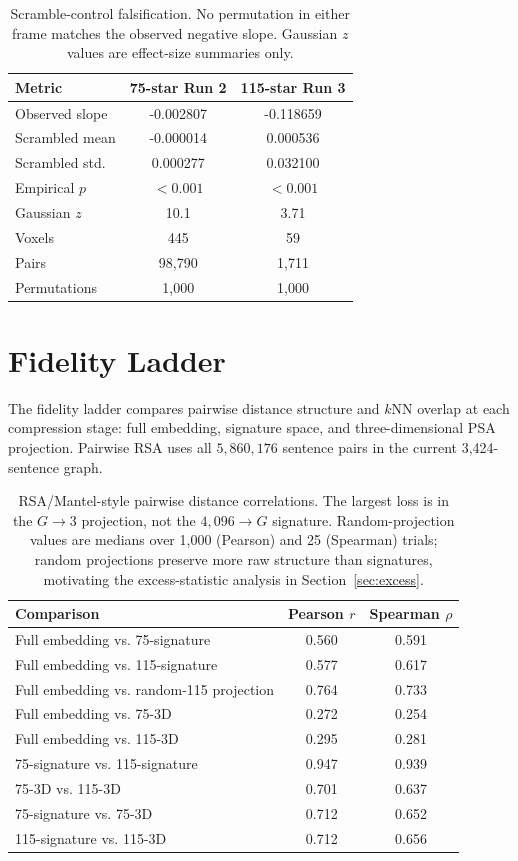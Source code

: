 \documentclass[11pt]{article}
\begin{document}
\begin{table}[t]
\centering
\small
\begin{tabular}{@{}lcc@{}}
\toprule
Metric & 75-star Run 2 & 115-star Run 3 \\
\midrule
Observed slope & -0.002807 & -0.118659 \\
Scrambled mean & -0.000014 & 0.000536 \\
Scrambled std. & 0.000277 & 0.032100 \\
Empirical $p$ & $<0.001$ & $<0.001$ \\
Gaussian $z$ & 10.1 & 3.71 \\
Voxels & 445 & 59 \\
Pairs & 98,790 & 1,711 \\
Permutations & 1,000 & 1,000 \\
\bottomrule
\end{tabular}
\caption{Scramble-control falsification. No permutation in either frame matches the observed negative slope. Gaussian $z$ values are effect-size summaries only.}
\label{tab:scramble}
\end{table}

\section{Fidelity Ladder}
\label{sec:fidelity}

The fidelity ladder compares pairwise distance structure and $k$NN overlap at each compression stage: full embedding, signature space, and three-dimensional PSA projection. Pairwise RSA uses all $5{,}860{,}176$ sentence pairs in the current 3,424-sentence graph.

\begin{table}[t]
\centering
\small
\begin{tabular}{@{}lcc@{}}
\toprule
Comparison & Pearson $r$ & Spearman $\rho$ \\
\midrule
Full embedding vs. 75-signature & 0.560 & 0.591 \\
Full embedding vs. 115-signature & 0.577 & 0.617 \\
Full embedding vs. random-115 projection & 0.764 & 0.733 \\
Full embedding vs. 75-3D & 0.272 & 0.254 \\
Full embedding vs. 115-3D & 0.295 & 0.281 \\
75-signature vs. 115-signature & 0.947 & 0.939 \\
75-3D vs. 115-3D & 0.701 & 0.637 \\
75-signature vs. 75-3D & 0.712 & 0.652 \\
115-signature vs. 115-3D & 0.712 & 0.656 \\
\bottomrule
\end{tabular}
\caption{RSA/Mantel-style pairwise distance correlations. The largest loss is in the $G\rightarrow3$ projection, not the $4{,}096\rightarrow G$ signature. Random-projection values are medians over 1{,}000 (Pearson) and 25 (Spearman) trials; random projections preserve more raw structure than signatures, motivating the excess-statistic analysis in Section~\ref{sec:excess}.}
\label{tab:rsa}
\end{table}
\end{document}
